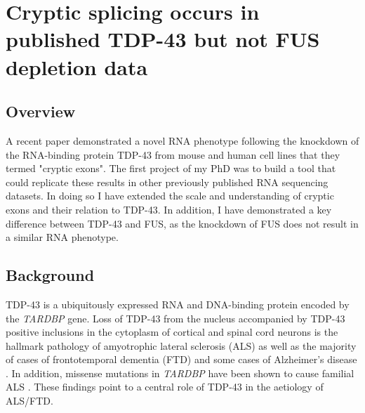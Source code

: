 \chapter{Cryptic splicing occurs in published TDP-43 but not FUS depletion data}


\section{Overview}
A recent paper \citep{Ling2015} demonstrated a novel RNA phenotype following the knockdown of the RNA-binding protein TDP-43 from mouse and human cell lines that they termed "cryptic exons". The first project of my PhD was to build a tool that could replicate these results in other previously published RNA sequencing datasets. In doing so I have extended the scale and understanding of cryptic exons and their relation to TDP-43. In addition, I have demonstrated a key difference between TDP-43 and FUS, as the knockdown of FUS does not result in a similar RNA phenotype.


\section{Background}
TDP-43 is a ubiquitously expressed RNA and DNA-binding protein encoded by the \emph{TARDBP} gene. Loss of TDP-43 from the nucleus accompanied by TDP-43 positive inclusions in the cytoplasm of cortical and spinal cord neurons is the hallmark pathology of amyotrophic lateral sclerosis (ALS) as well as the majority of  cases of frontotemporal dementia (FTD) \citep{Neumann2006-re} and some cases of Alzheimer's disease \citep{LaClair2016} . In addition, missense mutations in \emph{TARDBP} have been shown to cause familial ALS \citep{Sreedharan2008-xv}. These findings point to a central role of TDP-43 in the aetiology of ALS/FTD. 


